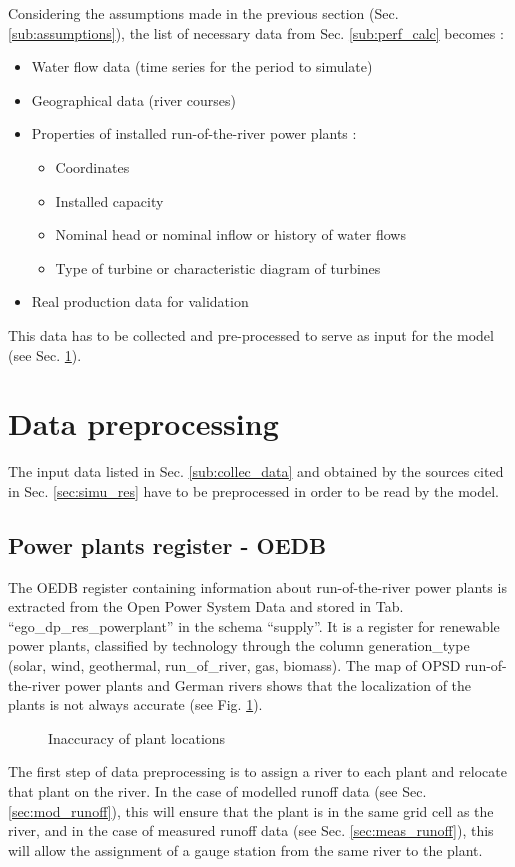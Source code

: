 Considering the assumptions made in the previous section (Sec. \ref{sub:assumptions}), the list of necessary data from Sec. \ref{sub:perf_calc} becomes :
\begin{itemize}
 \item Water flow data (time series for the period to simulate)
 \item Geographical data (river courses)
 \item Properties of installed run-of-the-river power plants :
 \begin{itemize}
  \item Coordinates
  \item Installed capacity
  \item Nominal head or nominal inflow or history of water flows
  \item Type of turbine or characteristic diagram of turbines
 \end{itemize}
 \item Real production data for validation
\end{itemize}

This data has to be collected and pre-processed to serve as input for the model (see Sec. \ref{sec:data_preproc}).

\section{Data preprocessing}
\label{sec:data_preproc}
The input data listed in Sec. \ref{sub:collec_data} and obtained by the sources cited in Sec. \ref{sec:simu_res} have to be preprocessed in order to be read by the model.

\subsection{Power plants register - OEDB}
\label{sub:pp_reg}

The OEDB register containing information about run-of-the-river power plants is extracted from the Open Power System Data and stored in Tab. ``ego{\_}dp{\_}res{\_}powerplant'' in the schema ``supply''. It is a register for renewable power plants, classified by technology through the column generation{\_}type (solar, wind, geothermal, run{\_}of{\_}river, gas, biomass). The map of OPSD run-of-the-river power plants and German rivers shows that the localization of the plants is not always accurate (see Fig. \ref{pp_river_dist}).
\begin{figure}[H]
\center
{}
\caption{Inaccuracy of plant locations}
\label{pp_river_dist}
\end{figure}
The first step of data preprocessing is to assign a river to each plant and relocate that plant on the river. \newline
In the case of modelled runoff data (see Sec. \ref{sec:mod_runoff}), this will ensure that the plant is in the same grid cell as the river, and in the case of measured runoff data (see Sec. \ref{sec:meas_runoff}), this will allow the assignment of a gauge station from the same river to the plant.


